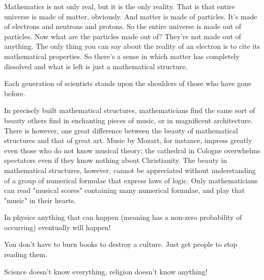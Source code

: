 	\begin{fquote}Mathematics is not only real, but it is the only reality. That is that entire universe is made of matter, obviously. And matter is made of particles. It's made of electrons and neutrons and protons. So the entire universe is made out of particles. Now what are the particles made out of? They're not made out of anything. The only thing you can say about the reality of an electron is to cite its mathematical properties. So there's a sense in which matter has completely dissolved and what is left is just a mathematical structure.
 	\end{fquote}
 	
 	\begin{fquote}Each generation of scientists stands upon the shoulders of those who have gone before.
 	\end{fquote}
 	
 	\begin{fquote}In precisely built mathematical structures, mathematicians find the same sort of beauty others find in enchanting pieces of music, or in magnificent architecture. There is however, one great difference between the beauty of mathematical structures and that of great art. Music by Mozart, for instance, impress greatly even those who do not know musical theory; the cathedral in Cologne overwhelms spectators even if they know nothing about Christianity. The beauty in mathematical structures, however, cannot be appreciated without understanding of a group of numerical formulae that express laws of logic. Only mathematicians can read "musical scores" containing many numerical formulae, and play that "music" in their hearts.
 	\end{fquote}
 	
 	\begin{fquote}In physics anything that can happen (meaning has a non-zero probability of occurring) eventually will happen!
 	\end{fquote}
 	
 	\begin{fquote}You don't have to burn books to destroy a culture. Just get people to stop reading them.
 	\end{fquote}
 	
 	\begin{fquote}Science doesn't know everything, religion doesn't know anything!
 	\end{fquote}
 	
